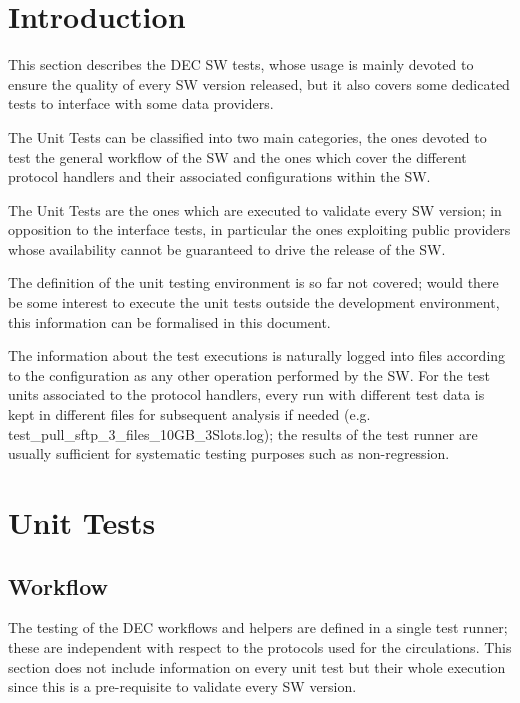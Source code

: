 \documentclass[dec_sum_main.tex]{subfiles}
\begin{document}
\section{Introduction}
This section describes the DEC SW tests, whose usage is mainly devoted to ensure the quality of every SW version released, but it also covers some dedicated tests to interface with some data providers.\newline

\par
\noindent
The Unit Tests can be classified into two main categories, the ones devoted to test the general workflow of the SW and the ones which cover the different protocol handlers and their associated configurations within the SW.\newline

\par
\noindent
The Unit Tests are the ones which are executed to validate every SW version; in opposition to the interface tests, in particular the ones exploiting public providers whose availability cannot be guaranteed to drive the release of the SW.\newline

\par
\noindent
The definition of the unit testing environment is so far not covered; would there be some interest to execute the unit tests outside the development environment, this information can be formalised in this document.\newline

\par
\noindent
The information about the test executions is naturally logged into files according to the configuration as any other operation performed by the SW. For the test units associated to the protocol handlers, every run with different test data is kept in different files for subsequent analysis if needed (e.g. test\_pull\_sftp\_3\_files\_10GB\_3Slots.log); the results of the test runner are usually sufficient for systematic testing purposes such as non-regression.

\section{Unit Tests}

\subsection{Workflow}
The testing of the DEC workflows and helpers are defined in a single test runner; these are independent with respect to the protocols used for the circulations. This section does not include information on every unit test but their whole execution since this is a pre-requisite to validate every SW version. \newline
\end{document}
